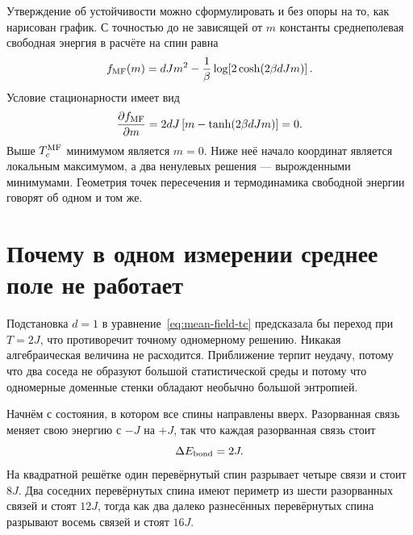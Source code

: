 Утверждение об устойчивости можно сформулировать и без опоры на то, как нарисован график. С точностью до не зависящей от \(m\) константы среднеполевая свободная энергия в расчёте на спин равна
\begin{equation}
f_{\rm MF}(m)
=dJm^2-\frac{1}{\beta}
\log\!\left[2\cosh(2\beta dJm)\right].
\label{eq:mf-free-energy}
\end{equation}
Условие стационарности имеет вид
\begin{equation}
\frac{\partial f_{\rm MF}}{\partial m}
=2dJ\left[m-\tanh(2\beta dJm)\right]=0.
\end{equation}
Выше \(T_c^{\rm MF}\) минимумом является \(m=0\). Ниже неё начало координат является локальным максимумом, а два ненулевых решения — вырожденными минимумами. Геометрия точек пересечения и термодинамика свободной энергии говорят об одном и том же.

\begin{classroomqa}
\end{classroomqa}

\section{Почему в одном измерении среднее поле не работает}

Подстановка \(d=1\) в уравнение~\eqref{eq:mean-field-tc} предсказала бы переход при \(T=2J\), что противоречит точному одномерному решению. Никакая алгебраическая величина не расходится. Приближение терпит неудачу, потому что два соседа не образуют большой статистической среды и потому что одномерные доменные стенки обладают необычно большой энтропией.

Начнём с состояния, в котором все спины направлены вверх. Разорванная связь меняет свою энергию с \(-J\) на \(+J\), так что каждая разорванная связь стоит
\begin{equation}
\Delta E_{\rm bond}=2J.
\end{equation}
На квадратной решётке один перевёрнутый спин разрывает четыре связи и стоит \(8J\). Два соседних перевёрнутых спина имеют периметр из шести разорванных связей и стоят \(12J\), тогда как два далеко разнесённых перевёрнутых спина разрывают восемь связей и стоят \(16J\).

